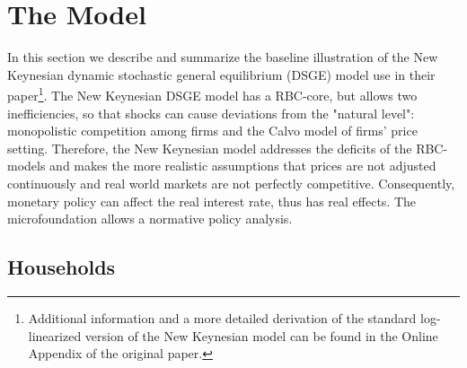 \documentclass[12pt,a4paper,oneside,titlepage]{article}
\begin{document}
\section{The Model}
In this section we describe and summarize the baseline illustration of the New Keynesian dynamic stochastic general equilibrium (DSGE) model \citet{Erceg.2014} use in their paper\footnote {Additional information and a more detailed derivation of the standard log-linearized version of the New Keynesian model can be found in the Online Appendix of the original paper.}. The New Keynesian DSGE model has a RBC-core, but allows two inefficiencies, so that shocks can cause deviations from the "natural level": monopolistic competition among firms and the Calvo model of firms' price setting. Therefore, the New Keynesian model addresses the deficits of the RBC-models and makes the more realistic assumptions that prices are not adjusted continuously and real world markets are not perfectly competitive. Consequently, monetary policy can affect the real interest rate, thus has real effects. The microfoundation allows a normative policy analysis.
\subsection*{Households}
\end{document}
